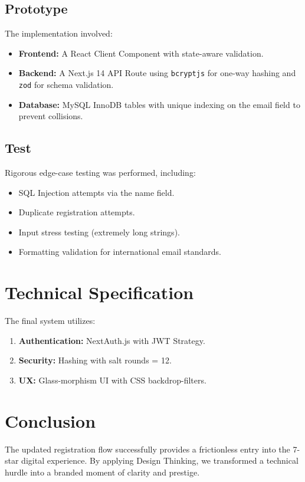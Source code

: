 \documentclass[11pt,a4paper]{article}
\begin{document}
\subsection{Prototype}
The implementation involved:
\begin{itemize}
    \item \textbf{Frontend:} A React Client Component with state-aware validation.
    \item \textbf{Backend:} A Next.js 14 API Route using \texttt{bcryptjs} for one-way hashing and \texttt{zod} for schema validation.
    \item \textbf{Database:} MySQL InnoDB tables with unique indexing on the email field to prevent collisions.
\end{itemize}

\subsection{Test}
Rigorous edge-case testing was performed, including:
\begin{itemize}
    \item SQL Injection attempts via the name field.
    \item Duplicate registration attempts.
    \item Input stress testing (extremely long strings).
    \item Formatting validation for international email standards.
\end{itemize}

\section{Technical Specification}
The final system utilizes:
\begin{enumerate}
    \item \textbf{Authentication:} NextAuth.js with JWT Strategy.
    \item \textbf{Security:} Hashing with salt rounds = 12.
    \item \textbf{UX:} Glass-morphism UI with CSS backdrop-filters.
\end{enumerate}

\section{Conclusion}
The updated registration flow successfully provides a frictionless entry into the 7-star digital experience. By applying Design Thinking, we transformed a technical hurdle into a branded moment of clarity and prestige.
\end{document}
